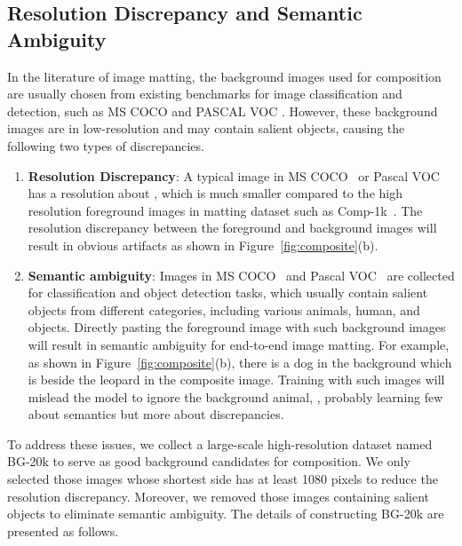 \documentclass[twocolumn]{svjour3}
\begin{document}
 
\subsection{Resolution Discrepancy and Semantic Ambiguity}
\label{section: bg20k}
In the literature of image matting, the background images used for composition are usually chosen from existing benchmarks for image classification and detection, such as MS COCO \citep{lin2014microsoft} and PASCAL VOC \citep{everingham2010pascal}. However, these background images are in low-resolution and may contain salient objects, causing the following two types of discrepancies.

\begin{enumerate}
  \item \textbf{Resolution Discrepancy}: A typical image in MS COCO~\citep{lin2014microsoft} or Pascal VOC~\citep{everingham2010pascal} has a resolution about , which is much smaller compared to the high resolution foreground images in matting dataset such as Comp-1k~\citep{xu2017deep}. The resolution discrepancy between the foreground and background images will result in obvious artifacts as shown in Figure~\ref{fig:composite}(b).
  \item \textbf{Semantic ambiguity}: Images in MS COCO~\citep{lin2014microsoft} and Pascal VOC~\citep{everingham2010pascal} are collected for classification and object detection tasks, which usually contain salient objects from different categories, including various animals, human, and objects. Directly pasting the foreground image with such background images will result in semantic ambiguity for end-to-end image matting. For example, as shown in Figure~\ref{fig:composite}(b), there is a dog in the background which is beside the leopard in the composite image. Training with such images will mislead the model to ignore the background animal, , probably learning few about semantics but more about discrepancies.
\end{enumerate}

To address these issues, we collect a large-scale high-resolution dataset named BG-20k to serve as good background candidates for composition. We only selected those images whose shortest side has at least 1080 pixels to reduce the resolution discrepancy. Moreover, we removed those images containing salient objects to eliminate semantic ambiguity. The details of constructing BG-20k are presented as follows.
\end{document}
